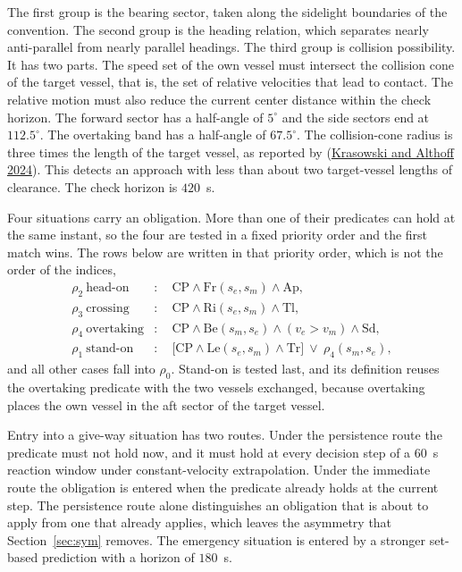 \documentclass[10pt,letterpaper]{article}
\newcommand{\citl}[2]{(\hyperlink{ref:#1}{#2})}
\begin{document}
The first group is the bearing sector, taken along the sidelight boundaries of the
convention. The second group is the heading relation, which separates nearly anti-parallel
from nearly parallel headings. The third group is collision possibility. It has two
parts. The speed set of the own vessel must intersect the collision cone of the target vessel,
that is, the set of relative velocities that lead to contact. The relative motion must
also reduce the current center distance within the check horizon. The forward sector
has a half-angle of $5^\circ$ and the side sectors end at $112.5^\circ$. The overtaking band
has a half-angle of $67.5^\circ$. The collision-cone radius is three times the length of the target vessel, as reported by
\citl{krasowski2024}{Krasowski and Althoff 2024}. This detects an approach with less
than about two target-vessel lengths of clearance. The check horizon is $420$~s.

Four situations carry an obligation. More than one of their predicates can hold at the same
instant, so the four are tested in a fixed priority order and the first match wins. The
rows below are written in that priority order, which is not the order of the indices,
\begin{equation}
\begin{aligned}
\rho_2\ \text{head-on}&:\quad \mathrm{CP}\wedge\mathrm{Fr}(s_e,s_m)\wedge\mathrm{Ap},\\
\rho_3\ \text{crossing}&:\quad \mathrm{CP}\wedge\mathrm{Ri}(s_e,s_m)\wedge\mathrm{Tl},\\
\rho_4\ \text{overtaking}&:\quad \mathrm{CP}\wedge\mathrm{Be}(s_m,s_e)\wedge(v_e>v_m)\wedge\mathrm{Sd},\\
\rho_1\ \text{stand-on}&:\quad \bigl[\mathrm{CP}\wedge\mathrm{Le}(s_e,s_m)\wedge\mathrm{Tr}\bigr]\ \vee\ \rho_4(s_m,s_e),
\end{aligned}
\label{eq:situations}
\end{equation}
and all other cases fall into $\rho_0$. Stand-on is tested last, and its definition reuses the overtaking predicate with the two
vessels exchanged, because overtaking places the own vessel in the aft sector of the
target vessel. 

Entry into a give-way situation has two routes. Under the persistence route the
predicate must not hold now, and it must hold at every decision step of a $60$~s
reaction window under constant-velocity extrapolation. Under the immediate route the
obligation is entered when the predicate already holds at the current step. The
persistence route alone distinguishes an obligation that is about to apply from one that
already applies, which leaves the asymmetry that Section~\ref{sec:sym} removes. The emergency situation is
entered by a stronger set-based prediction with a horizon of $180$~s.
\end{document}

